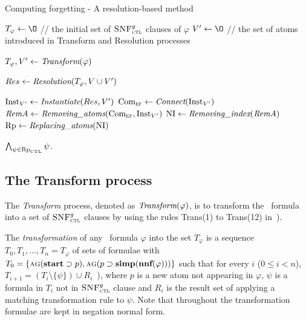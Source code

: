 \documentclass{article}
\begin{document}
\begin{algorithm}[!h]
\caption{Computing forgetting - A resolution-based method}%
\label{alg:compute:forgetting:by:Resolution}
$T_{\varphi}\lto {\O}$ // the initial set of ${\textsc{SNF}_{\textsc{ctl}}^g}$ clauses of $\varphi$ \;
$V'\lto {\O}$ // the set of atoms introduced in Transform and Resolution processes\;


$T_{\varphi}, V' \leftarrow \emph{Transform}(\varphi)$\;

$Res \leftarrow \emph{Resolution}(T_{\varphi}, V\cup V')$ \;

$\textrm{Inst}_{V'} \leftarrow \emph{Instantiate}(Res, V')$ \;
$\textrm{Com}_{\textsc{e}\textsc{f}} \leftarrow \emph{Connect}(\textrm{Inst}_{V'})$  \;
$\emph{RemA} \leftarrow \emph{Removing\_atoms}(\textrm{Com}_{\textsc{e}\textsc{f}}, \textrm{Inst}_{V'})$ \;
$\textrm{NI} \leftarrow \emph{Removing\_index}(\emph{RemA})$ \;
$\textrm{Rp} \leftarrow \emph{Replacing\_atoms}(\textrm{NI})$\;

\Return $\bigwedge_{\psi \in \textrm{Rp}_{\textrm{CTL}}} \psi$.
\end{algorithm}




\subsection{The Transform process}
The \emph{Transform} process, denoted as $\emph{Transform}(\varphi)$, is to transform the \CTL\ formula into a set of ${\textsc{SNF}_{\textsc{ctl}}^g}$ clauses by using the rules  Trans(1) to Trans(12) in~\cite{zhang2009refined}).

The \emph{transformation} of any \CTL\ formula $\varphi$ into the set $T_{\varphi}$ is a sequence $T_0, T_1,\dots, T_n=T_{\varphi}$ of sets of formulae with $T_0=\{\textsc{a} \textsc{g}(\textbf{start} \supset p), \textsc{a} \textsc{g}(p \supset \textbf{simp}(\textbf{nnf}(\varphi)))\}$ such that for every $i$ ($0 \leq i< n$), $T_{i+1} = (T_i \setminus \{\psi\}) \cup R_i$~\cite{zhang2009refined}), where $p$ is a new atom not appearing in $\varphi$, $\psi$ is a formula in $T_i$ not in ${\textsc{SNF}_{\textsc{ctl}}^g}$ clause and $R_i$ is the result set of applying a matching transformation rule to $\psi$. Note that throughout the transformation formulae are kept in negation normal form.
\end{document}
